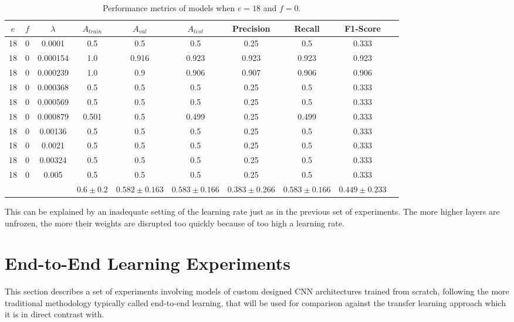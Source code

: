 \begin{table}[ht]
\centering
\begin{tabular}{ |c|c|c|c|c|c|c|c|c|c| }
\hline
$e$ & $f$ & $\lambda$ & $A_{train}$ & $A_{val}$ & $A_{test}$ & Precision & Recall & F1-Score \\
\hline
18 & 0 & 0.0001 & 0.5 & 0.5 & 0.5 & 0.25 & 0.5 & 0.333 \\
18 & 0 & 0.000154 & 1.0 & 0.916 & 0.923 & 0.923 & 0.923 & 0.923 \\
18 & 0 & 0.000239 & 1.0 & 0.9 & 0.906 & 0.907 & 0.906 & 0.906 \\
18 & 0 & 0.000368 & 0.5 & 0.5 & 0.5 & 0.25 & 0.5 & 0.333 \\
18 & 0 & 0.000569 & 0.5 & 0.5 & 0.5 & 0.25 & 0.5 & 0.333 \\
18 & 0 & 0.000879 & 0.501 & 0.5 & 0.499 & 0.25 & 0.499 & 0.333 \\
18 & 0 & 0.00136 & 0.5 & 0.5 & 0.5 & 0.25 & 0.5 & 0.333 \\
18 & 0 & 0.0021 & 0.5 & 0.5 & 0.5 & 0.25 & 0.5 & 0.333 \\
18 & 0 & 0.00324 & 0.5 & 0.5 & 0.5 & 0.25 & 0.5 & 0.333 \\
18 & 0 & 0.005 & 0.5 & 0.5 & 0.5 & 0.25 & 0.5 & 0.333 \\
\hline
 & & & $0.6\pm0.2$ & $0.582\pm0.163$ & $0.583\pm0.166$ & $0.383\pm0.266$ & $0.583\pm0.166$ & $0.449\pm0.233$ \\
\hline
\end{tabular}
\caption{Performance metrics of models when $e = 18$ and $f = 0$.}
\label{table:vgg16_finetuning_0}
\end{table}

This can be explained by an inadequate setting of the learning rate just as in the previous set of experiments. The more higher layers are unfrozen, the more their weights are disrupted too quickly because of too high a learning rate.


\section{End-to-End Learning Experiments}

This section describes a set of experiments involving models of custom designed \ac{CNN} architectures trained from scratch, following the more traditional methodology typically called end-to-end learning, that will be used for comparison against the transfer learning approach which it is in direct contrast with.

